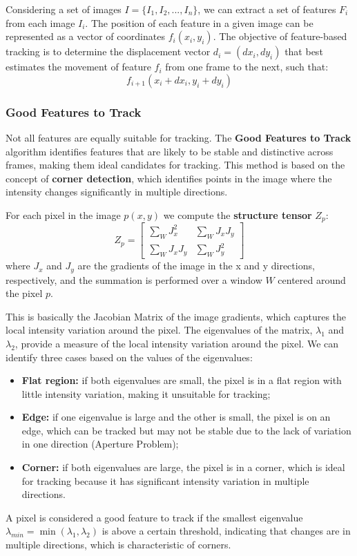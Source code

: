 Considering a set of images $I = \{I_1, I_2, ..., I_n\}$, we can extract a set of features $F_i$ from each image $I_i$.
The position of each feature in a given image can be represented as a vector of coordinates $f_i(x_i, y_i)$.
The objective of feature-based tracking is to determine the displacement vector $d_i = (dx_i, dy_i)$ that best estimates the movement of
feature $f_i$ from one frame to the next, such that:
$$f_{i+1}(x_i + dx_i, y_i + dy_i)$$

\subsubsection{Good Features to Track}
Not all features are equally suitable for tracking. 
The \textbf{Good Features to Track} algorithm identifies features that are likely to be stable and distinctive across frames, making them ideal candidates for tracking.
This method is based on the concept of \textbf{corner detection}, which identifies points in the image where the intensity changes significantly in multiple directions.

For each pixel in the image $p(x, y)$ we compute the \textbf{structure tensor} $Z_p$:
$$Z_p = \begin{bmatrix}
    \sum_{W} J_x^2 & \sum_{W} J_x J_y \\
    \sum_{W} J_x J_y & \sum_{W} J_y^2
\end{bmatrix}$$
where $J_x$ and $J_y$ are the gradients of the image in the x and y directions, respectively, 
and the summation is performed over a window $W$ centered around the pixel $p$.

This is basically the Jacobian Matrix of the image gradients, which captures the local intensity variation around the pixel.
The eigenvalues of the matrix, $\lambda_1$ and $\lambda_2$, provide a measure of the local intensity variation around the pixel.
We can identify three cases based on the values of the eigenvalues:
\begin{itemize}
    \item \textbf{Flat region:} if both eigenvalues are small, the pixel is in a flat region with little intensity variation, making it unsuitable for tracking;
    \item \textbf{Edge:} if one eigenvalue is large and the other is small, the pixel is on an edge, which can be tracked but may not be stable due to the lack of variation in one direction (Aperture Problem);
    \item \textbf{Corner:} if both eigenvalues are large, the pixel is in a corner, which is ideal for tracking because it has significant intensity variation in multiple directions.
\end{itemize}
A pixel is considered a good feature to track if the smallest eigenvalue $\lambda_{min} = \min(\lambda_1, \lambda_2)$ is above a certain threshold, 
indicating that changes are in multiple directions, which is characteristic of corners.

